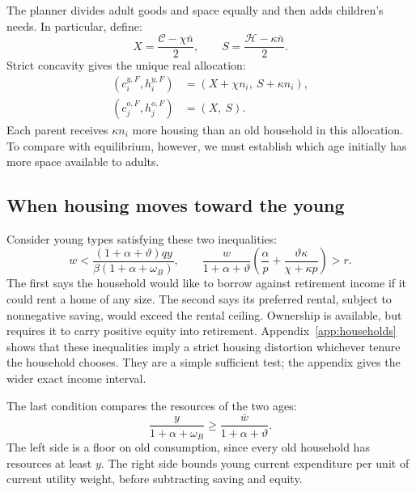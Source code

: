 \documentclass[11pt]{article}
\begin{document}
The planner divides adult goods and space equally and then adds children's
needs. In particular, define:
\begin{equation}
X=\frac{\mathcal C-\chi\bar n}{2},\qquad
S=\frac{\mathcal H-\kappa\bar n}{2}.
\label{eq:adult_allocation}
\end{equation}
Strict concavity gives the unique real allocation:
\begin{equation}
\boxed{\begin{aligned}
(c_i^{y,F},h_i^{y,F})&=(X+\chi n_i,\ S+\kappa n_i),\\
(c_j^{o,F},h_j^{o,F})&=(X,\ S).
\end{aligned}}
\label{eq:full_allocation}
\end{equation}
Each parent receives $\kappa n_i$ more housing than an old household in this
allocation. To compare with equilibrium, however, we must establish which
age initially has more space available to adults.

\subsection{When housing moves toward the young}

Consider young types satisfying these two inequalities:
\begin{equation}
\boxed{\quad
w<\frac{(1+\alpha+\vartheta)qy}{\beta(1+\alpha+\omega_B)},\qquad
\frac{w}{1+\alpha+\vartheta}\left(\frac{\alpha}{p}
       +\frac{\vartheta\kappa}{\chi+\kappa p}\right)>r.
\quad}
\tag{A2}\label{ass:affected}
\end{equation}
The first says the household would like to borrow against retirement income
if it could rent a home of any size. The second says its preferred rental,
subject to nonnegative saving, would exceed the rental ceiling. Ownership is
available, but requires it to carry positive equity into retirement.
Appendix~\ref{app:households} shows that these inequalities imply a strict
housing distortion whichever tenure the household chooses. They are a
simple sufficient test; the appendix gives the wider exact income interval.

The last condition compares the resources of the two ages:
\begin{equation}
\boxed{\frac{y}{1+\alpha+\omega_B}\ge\frac{\bar w}{1+\alpha+\vartheta}.}
\tag{A3}\label{ass:resources}
\end{equation}
The left side is a floor on old consumption, since every old household has
resources at least $y$. The right side bounds young current expenditure per
unit of current utility weight, before subtracting saving and equity.
\end{document}
